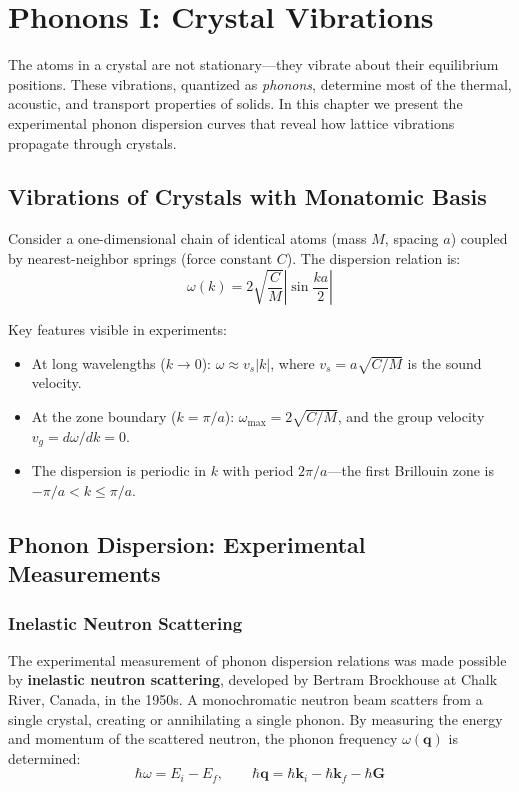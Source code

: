 \chapter{Phonons I: Crystal Vibrations}

The atoms in a crystal are not stationary---they vibrate about their equilibrium positions. These vibrations, quantized as \textit{phonons}, determine most of the thermal, acoustic, and transport properties of solids. In this chapter we present the experimental phonon dispersion curves that reveal how lattice vibrations propagate through crystals.

\section{Vibrations of Crystals with Monatomic Basis}

Consider a one-dimensional chain of identical atoms (mass $M$, spacing $a$) coupled by nearest-neighbor springs (force constant $C$). The dispersion relation is:
\begin{equation}
  \omega(k) = 2\sqrt{\frac{C}{M}}\left|\sin\frac{ka}{2}\right|
\end{equation}

Key features visible in experiments:
\begin{itemize}[nosep]
  \item At long wavelengths ($k \to 0$): $\omega \approx v_s |k|$, where $v_s = a\sqrt{C/M}$ is the sound velocity.
  \item At the zone boundary ($k = \pi/a$): $\omega_{\max} = 2\sqrt{C/M}$, and the group velocity $v_g = d\omega/dk = 0$.
  \item The dispersion is periodic in $k$ with period $2\pi/a$---the first Brillouin zone is $-\pi/a < k \leq \pi/a$.
\end{itemize}

\section{Phonon Dispersion: Experimental Measurements}

\subsection{Inelastic Neutron Scattering}

The experimental measurement of phonon dispersion relations was made possible by \textbf{inelastic neutron scattering}, developed by Bertram Brockhouse at Chalk River, Canada, in the 1950s. A monochromatic neutron beam scatters from a single crystal, creating or annihilating a single phonon. By measuring the energy and momentum of the scattered neutron, the phonon frequency $\omega(\mathbf{q})$ is determined:
\begin{equation}
  \hbar\omega = E_i - E_f, \qquad \hbar\mathbf{q} = \hbar\mathbf{k}_i - \hbar\mathbf{k}_f - \hbar\mathbf{G}
\end{equation}

